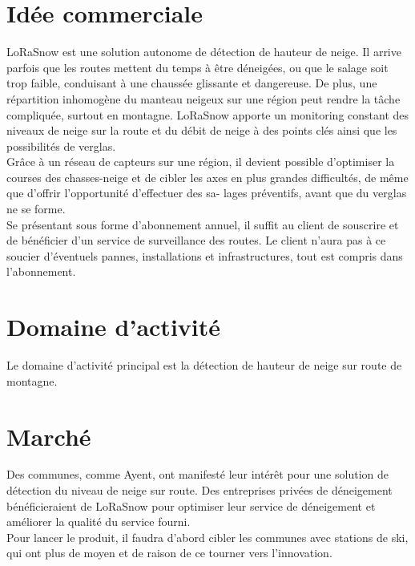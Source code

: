 \section{Idée commerciale}
LoRaSnow est une solution autonome de détection de hauteur de neige. 
Il arrive parfois que les routes mettent du temps à être déneigées, ou que le salage soit trop
faible, conduisant à une chaussée glissante et dangereuse. De plus, une répartition inhomogène du manteau neigeux sur une
région peut rendre la tâche compliquée, surtout en montagne. LoRaSnow apporte un monitoring constant
des niveaux de neige sur la route et du débit de neige à des points clés ainsi que les possibilités de verglas.\\[0.2cm]
Grâce à un réseau de capteurs sur une région, il devient possible d’optimiser la courses des chasses-neige
et de cibler les axes en plus grandes difficultés, de même que d’offrir l’opportunité d’effectuer des sa-
lages préventifs, avant que du verglas ne se forme.\\[0.2cm]
Se présentant sous forme d'abonnement annuel, il suffit au client de souscrire et de bénéficier
d'un service de surveillance des routes. Le client n'aura pas à ce soucier d'éventuels pannes, installations
et infrastructures, tout est compris dans l'abonnement.

\section{Domaine d'activité}
Le domaine d'activité principal est la détection de hauteur de neige sur route de montagne.

\section{Marché}
Des communes, comme Ayent, ont manifesté leur intérêt pour une solution
de détection du niveau de neige sur route.
Des entreprises privées de déneigement bénéficieraient de LoRaSnow pour
optimiser leur service de déneigement et améliorer la qualité du service
fourni.\\
Pour lancer le produit, il faudra d'abord cibler les communes avec stations de ski,
qui ont plus de moyen et de raison de ce tourner vers l'innovation.\newpage

